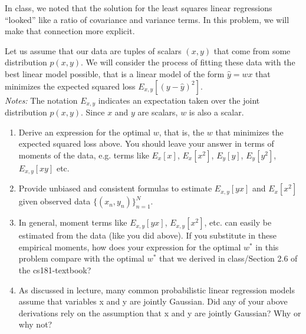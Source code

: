 \documentclass[submit]{harvardml}
\begin{document}
\begin{problem}

  In class, we noted that the solution for the least squares linear
  regressions ``looked'' like a ratio of covariance and variance
  terms.  In this problem, we will make that connection more explicit.

  Let us assume that our data are tuples of scalars $(x,y)$ that come from
  some distribution $p(x,y)$.  We will consider the process of fitting
  these data with the best linear model possible, that is a linear
  model of the form $\hat{y} = wx$ that minimizes the expected squared
  loss $E_{x,y}[ ( y - \hat{y} )^2 ]$.\\

\noindent \emph{Notes:} The notation $E_{x, y}$ indicates an
expectation taken over the joint distribution $p(x,y)$.  Since $x$ and
$y$ are scalars, $w$ is also a scalar.

  \begin{enumerate}

  \item Derive an expression for the optimal $w$, that is, the $w$
    that minimizes the expected squared loss above.  You should leave
    your answer in terms of moments of the data, e.g. terms like
    $E_x[x]$, $E_x[x^2]$, $E_y[y]$, $E_y[y^2]$, $E_{x,y}[xy]$ etc.

\item Provide unbiased and consistent formulas to estimate $E_{x, y}[yx]$
 and $E_x[x^2]$ given observed data $\{(x_n,y_n)\}_{n=1}^N$.

\item In general, moment terms like $E_{x, y}[yx]$, $E_{x, y}[x^2]$,
  etc. can easily be estimated from the data (like you did above).  If
  you substitute in these empirical moments, how does your expression
  for the optimal $w^*$ in this problem compare with the optimal $w^*$
  that we derived in class/Section 2.6 of the cs181-textbook?

\item As discussed in lecture, many common probabilistic linear regression models assume that variables x and y are jointly Gaussian.  Did any of your above derivations rely on the assumption that x and y are jointly Gaussian?  Why or why not?

\end{enumerate}

\end{problem}
\end{document}
